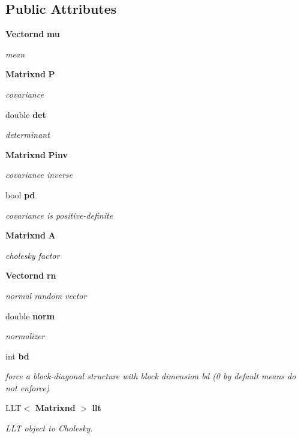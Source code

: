 \subsection*{\-Public \-Attributes}
\begin{DoxyCompactItemize}
\item 
{\bf \-Vectornd} {\bf mu}
\begin{DoxyCompactList}\small\item\em mean \end{DoxyCompactList}\item 
{\bf \-Matrixnd} {\bf \-P}
\begin{DoxyCompactList}\small\item\em covariance \end{DoxyCompactList}\item 
double {\bf det}
\begin{DoxyCompactList}\small\item\em determinant \end{DoxyCompactList}\item 
{\bf \-Matrixnd} {\bf \-Pinv}
\begin{DoxyCompactList}\small\item\em covariance inverse \end{DoxyCompactList}\item 
bool {\bf pd}
\begin{DoxyCompactList}\small\item\em covariance is positive-\/definite \end{DoxyCompactList}\item 
{\bf \-Matrixnd} {\bf \-A}
\begin{DoxyCompactList}\small\item\em cholesky factor \end{DoxyCompactList}\item 
{\bf \-Vectornd} {\bf rn}
\begin{DoxyCompactList}\small\item\em normal random vector \end{DoxyCompactList}\item 
double {\bf norm}
\begin{DoxyCompactList}\small\item\em normalizer \end{DoxyCompactList}\item 
int {\bf bd}
\begin{DoxyCompactList}\small\item\em force a block-\/diagonal structure with block dimension bd (0 by default means do not enforce) \end{DoxyCompactList}\item 
\-L\-L\-T$<$ {\bf \-Matrixnd} $>$ {\bf llt}
\begin{DoxyCompactList}\small\item\em \-L\-L\-T object to \-Cholesky. \end{DoxyCompactList}\end{DoxyCompactItemize}
